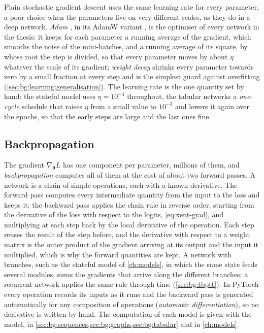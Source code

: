 Plain stochastic gradient descent uses the same learning rate for every parameter, a poor
choice when the parameters live on very different scales, as they do in a deep network.
\emph{Adam} \cite{kingma2015adam}, in its AdamW variant \cite{loshchilov2019adamw}, is
the optimiser of every network in the thesis: it keeps for each parameter a running average
of the gradient, which smooths the noise of the mini-batches, and a running average of its
square, by whose root the step is divided, so that every parameter moves by about $\eta$
whatever the scale of its gradient; \emph{weight decay} shrinks every parameter towards
zero by a small fraction at every step and is the simplest guard against overfitting
(\cref{sec:bg:learning:generalisation}).  The learning rate is the one quantity set by
hand: the stateful model uses $\eta = 10^{-4}$ throughout, the tabular networks a
\emph{one-cycle} schedule that raises $\eta$ from a small value to $10^{-3}$ and lowers
it again over the epochs, so that the early steps are large and the last ones fine.

\subsection{Backpropagation}
\label{sec:bg:learning:backprop}

The gradient $\nabla_{\boldsymbol{\theta}} L$ has one component per parameter, millions of
them, and \emph{backpropagation} \cite{rumelhart1986backprop} computes all of them at the
cost of about two forward passes.  A network is a chain of simple operations, each with a
known derivative.  The forward pass computes every intermediate quantity from the input to
the loss and keeps it; the backward pass applies the chain rule in reverse order, starting
from the derivative of the loss with respect to the logits, \cref{eq:xent-grad}, and
multiplying at each step back by the local derivative of the operation.  Each step reuses
the result of the step before, and the derivative with respect to a weight matrix is the
outer product of the gradient arriving at its output and the input it multiplied, which is
why the forward quantities are kept.  A network with branches, such as the stateful model
of \cref{ch:models}, in which the same state feeds several modules, sums the gradients
that arrive along the different branches; a recurrent network applies the same rule
through time (\cref{sec:bg:tbptt}).  In PyTorch \cite{paszke2019pytorch} every operation
records its inputs as it runs and the backward pass is generated automatically for any
composition of operations (\emph{automatic differentiation}), so no derivative is written
by hand.  The computation of each model is given with the model, in
\cref{sec:bg:sequences,sec:bg:graphs,sec:bg:tabular} and in \cref{ch:models}.

